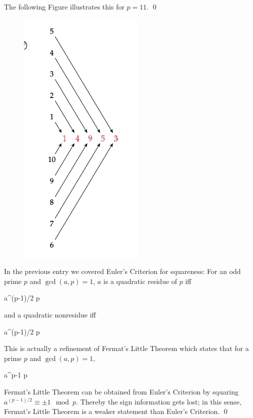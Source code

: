 The following Figure illustrates this for $p=11$. \qed

\begin{figure}[H]
    \centering
    \includegraphics[scale=0.75]{images/2023-02-22-quadr_con_04.png}
\end{figure}

In the previous entry we covered Euler's Criterion for squareness: For an odd prime $p$ and $\gcd(a,p)=1$, $a$ is a quadratic residue of $p$ iff

\bee
a^{(p-1)/2}  \mod p
\eee

and a quadratic nonresidue iff

\bee
a^{(p-1)/2}  \mod p
\eee

This is actually a refinement of Fermat's Little Theorem which states that for a prime $p$ and $\gcd(a,p)=1$,

\bee
a^{p-1}  \mod p
\eee

Fermat's Little Theorem can be obtained from Euler's Criterion by squaring $a^{(p-1)/2} \equiv \pm 1 \mod p$. Thereby the sign information gets lost; in this sense, Fermat's Little Theorem is a weaker statement than Euler's Criterion. \qed




